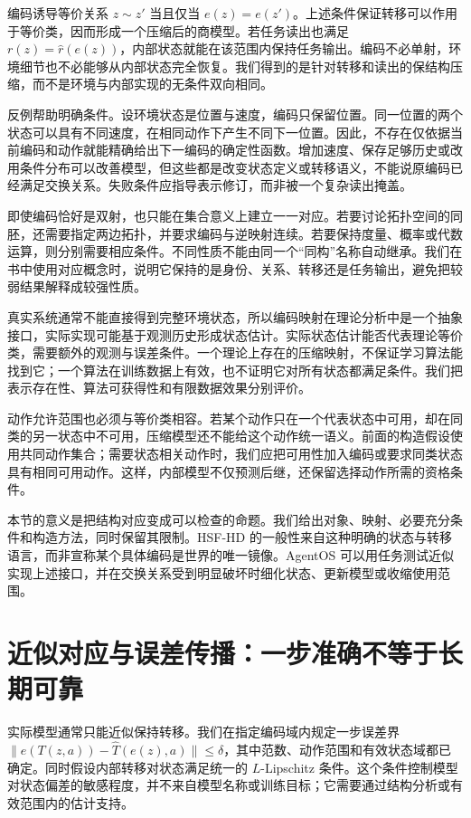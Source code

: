 编码诱导等价关系 $z\sim z'$ 当且仅当 $e(z)=e(z')$。上述条件保证转移可以作用于等价类，因而形成一个压缩后的商模型。若任务读出也满足 $r(z)=\widehat r(e(z))$，内部状态就能在该范围内保持任务输出。编码不必单射，环境细节也不必能够从内部状态完全恢复。我们得到的是针对转移和读出的保结构压缩，而不是环境与内部实现的无条件双向相同。

反例帮助明确条件。设环境状态是位置与速度，编码只保留位置。同一位置的两个状态可以具有不同速度，在相同动作下产生不同下一位置。因此，不存在仅依据当前编码和动作就能精确给出下一编码的确定性函数。增加速度、保存足够历史或改用条件分布可以改善模型，但这些都是改变状态定义或转移语义，不能说原编码已经满足交换关系。失败条件应指导表示修订，而非被一个复杂读出掩盖。

即使编码恰好是双射，也只能在集合意义上建立一一对应。若要讨论拓扑空间的同胚，还需要指定两边拓扑，并要求编码与逆映射连续。若要保持度量、概率或代数运算，则分别需要相应条件。不同性质不能由同一个“同构”名称自动继承。我们在书中使用对应概念时，说明它保持的是身份、关系、转移还是任务输出，避免把较弱结果解释成较强性质。

真实系统通常不能直接得到完整环境状态，所以编码映射在理论分析中是一个抽象接口，实际实现可能基于观测历史形成状态估计。实际状态估计能否代表理论等价类，需要额外的观测与误差条件。一个理论上存在的压缩映射，不保证学习算法能找到它；一个算法在训练数据上有效，也不证明它对所有状态都满足条件。我们把表示存在性、算法可获得性和有限数据效果分别评价。

动作允许范围也必须与等价类相容。若某个动作只在一个代表状态中可用，却在同类的另一状态中不可用，压缩模型还不能给这个动作统一语义。前面的构造假设使用共同动作集合；需要状态相关动作时，我们应把可用性加入编码或要求同类状态具有相同可用动作。这样，内部模型不仅预测后继，还保留选择动作所需的资格条件。

本节的意义是把结构对应变成可以检查的命题。我们给出对象、映射、必要充分条件和构造方法，同时保留其限制。HSF-HD 的一般性来自这种明确的状态与转移语言，而非宣称某个具体编码是世界的唯一镜像。AgentOS 可以用任务测试近似实现上述接口，并在交换关系受到明显破坏时细化状态、更新模型或收缩使用范围。

\section{近似对应与误差传播：一步准确不等于长期可靠}
\label{sec:comprehensibility}

实际模型通常只能近似保持转移。我们在指定编码域内规定一步误差界 $\|e(T(z,a))-\widehat T(e(z),a)\|\leq\delta$，其中范数、动作范围和有效状态域都已确定。同时假设内部转移对状态满足统一的 $L$-Lipschitz 条件。这个条件控制模型对状态偏差的敏感程度，并不来自模型名称或训练目标；它需要通过结构分析或有效范围内的估计支持。

